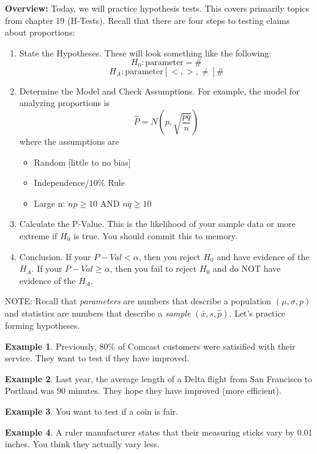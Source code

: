 \documentclass[12pt]{amsart}
\theoremstyle{definition}
\newtheorem{ex}{Example}
\begin{document}
 \textbf{Overview:} Today, we will practice hypothesis tests. This covers primarily topics from chapter 19 (H-Tests). Recall that there are four steps to testing claims about proportions:
 \begin{framed}
 \begin{enumerate}
 	\item State the Hypotheses. These will look something like the following: $$H_0:\text{parameter}=\#$$ $$H_A:\text{parameter} [<,>,\neq]\#$$
 	\item Determine the Model and Check Assumptions. For example, the model for analyzing proportions is $$\hat{P}=N\left(p,\sqrt{\frac{pq}{n}}\right)$$ where the assumptions are 
 	\begin{itemize}
 		\item Random [little to no bias]
 		\item Independence/$10\%$ Rule
 		\item Large n: $np\geq10$ AND $nq\geq 10$
 	\end{itemize}
 	\item Calculate the P-Value. This is the likelihood of your sample data or more extreme if $H_0$ is true. You should commit this to memory.
 	\item Conclusion. If your $P-Val<\alpha$, then you reject $H_0$ and have evidence of the $H_A$. If your $P-Val\geq \alpha$, then you fail to reject $H_0$ and do NOT have evidence of the $H_A$.
 \end{enumerate}
 \end{framed}
 
 NOTE: Recall that \emph{parameters} are numbers that describe a population $(\mu,\sigma,p)$ and statistics are numbers that describe a \emph{sample} $(\bar{x},s,\hat{p})$. Let's practice forming hypotheses.
 
 \begin{ex} Previously, $80\%$ of Comcast customers were satisified with their service. They want to test if they have improved.
 	\end{ex}
 	\newpage
 \begin{ex} Last year, the average length of a Delta flight from San Francisco to Portland was $90$ minutes. They hope they have improved (more efficient).\end{ex}\vfill
 	\begin{ex} You want to test if a coin is fair.\end{ex}\vfill
 	\begin{ex}
 	 A ruler manufacturer states that their measuring sticks vary by $0.01$ inches. You think they actually vary less.	
 	\end{ex}\vfill
 
\end{document}
